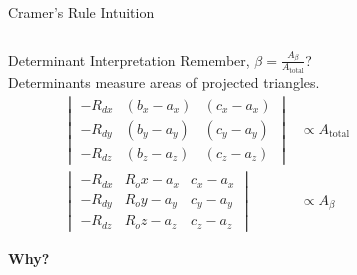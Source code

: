 {
    \begin{frame}{Cramer's Rule Intuition}
        \begin{columns}
            \begin{column}{0.65\textwidth}
                \begin{mathbox}{Determinant Interpretation}
                    Remember, $\beta = \frac{A_{\beta}}{A_{\text{total}}}$? \\

                    Determinants measure areas of projected triangles.
                    \begin{align*}
                        \begin{vmatrix}
                            -R_{dx} & (b_x-a_x) & (c_x-a_x) \\
                            -R_{dy} & (b_y-a_y) & (c_y-a_y) \\
                            -R_{dz} & (b_z-a_z) & (c_z-a_z)
                        \end{vmatrix} &\propto A_{\text{total}} \\
                        \begin{vmatrix}
                            -R_{dx} & R_ox-a_x & c_x-a_x \\
                            -R_{dy} & R_oy-a_y & c_y-a_y \\
                            -R_{dz} & R_oz-a_z & c_z-a_z
                        \end{vmatrix} &\propto A_{\beta}
                    \end{align*}
                    
                    \textbf{Why?}
                \end{mathbox}
                
            \end{column}
            \begin{column}{0.35\textwidth}
                \centering
\end{column}
\end{columns}
\end{frame}}
